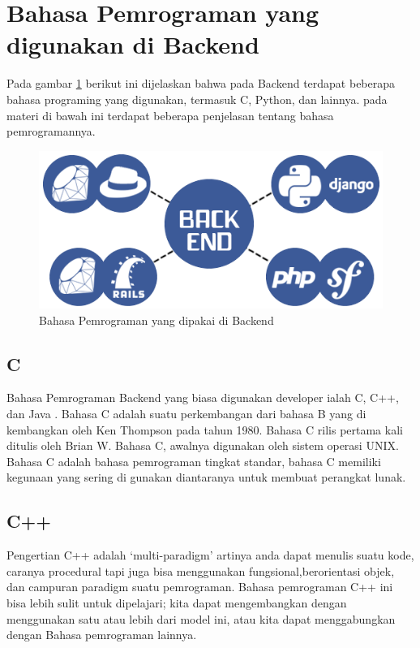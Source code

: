 \section{Bahasa Pemrograman yang digunakan di Backend}
Pada gambar \ref{2labelgambar} berikut ini dijelaskan bahwa pada Backend terdapat beberapa bahasa programing yang digunakan,
termasuk C, Python, dan lainnya. pada materi di bawah ini terdapat beberapa penjelasan tentang bahasa pemrogramannya.

\begin{figure}[ht]
\centerline{\includegraphics[width=1\textwidth]{figures/1bahasapemrogramanbackend.png}}
\caption{Bahasa Pemrograman yang dipakai di Backend}
\label{2labelgambar}
\end{figure}

\subsection{C}
	Bahasa Pemrograman Backend yang biasa digunakan developer ialah C, C++, dan Java .
Bahasa C adalah suatu perkembangan dari bahasa B yang di kembangkan oleh Ken Thompson pada tahun 1980.
Bahasa C rilis pertama kali ditulis oleh Brian W. Bahasa C, awalnya digunakan oleh sistem operasi UNIX.
Bahasa C adalah bahasa pemrograman tingkat standar, bahasa C memiliki kegunaan yang sering di gunakan
diantaranya untuk membuat perangkat lunak.

\subsection {C++}
	Pengertian C++ adalah `multi-paradigm' artinya anda dapat menulis suatu kode, caranya procedural 
tapi juga bisa menggunakan fungsional,berorientasi objek, dan campuran paradigm suatu pemrograman.  
Bahasa pemrograman C++ ini bisa lebih sulit untuk dipelajari; kita dapat mengembangkan dengan 
menggunakan satu atau lebih dari model ini,  atau kita dapat menggabungkan dengan Bahasa pemrograman lainnya.

